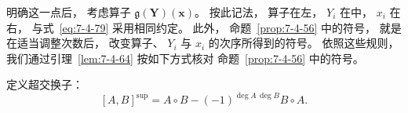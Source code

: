 明确这一点后，
考虑算子
$\mathfrak g(\mathbf Y)(\mathbf x)$。
按此记法，
算子在左，
$Y_i$ 在中，
$x_i$ 在右，
与式~\eqref{eq:7-4-79}
采用相同约定。
此外，
命题~\ref{prop:7-4-56}
中的符号，
就是在适当调整次数后，
改变算子、
$Y_i$ 与 $x_i$
的次序所得到的符号。
依照这些规则，
我们通过引理~\ref{lem:7-4-64}
按如下方式核对
命题~\ref{prop:7-4-56}
中的符号。

定义超交换子：
\[
[A,B]^{\mathrm{sup}}
=A\circ B
-(-1)^{\deg A\,\deg B}
B\circ A.
\]
